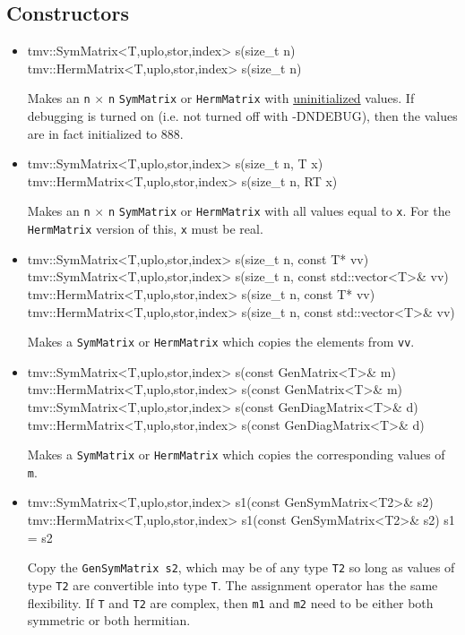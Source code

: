 \documentclass[twoside,letterpaper,11pt]{article}
\renewcommand{\tt}[1]{{\lstinline {#1}}}
\begin{document}
\subsection{Constructors}
\label{SymMatrix_Constructors}

\begin{itemize}
\item 
\begin{tmvcode}
tmv::SymMatrix<T,uplo,stor,index> s(size_t n)
tmv::HermMatrix<T,uplo,stor,index> s(size_t n)
\end{tmvcode}
Makes an \tt{n} $\times$ \tt{n} \tt{SymMatrix} or \tt{HermMatrix}
with \underline{uninitialized} values.
If debugging is turned on (i.e. not turned off
with -DNDEBUG), then the values are in fact initialized to 888.  

\item
\begin{tmvcode}
tmv::SymMatrix<T,uplo,stor,index> s(size_t n, T x)
tmv::HermMatrix<T,uplo,stor,index> s(size_t n, RT x)
\end{tmvcode}
Makes an \tt{n} $\times$ \tt{n} \tt{SymMatrix} or \tt{HermMatrix} 
with all values equal to \tt{x}.
For the \tt{HermMatrix} version of this, \tt{x} must be real.

\item
\begin{tmvcode}
tmv::SymMatrix<T,uplo,stor,index> s(size_t n, const T* vv)
tmv::SymMatrix<T,uplo,stor,index> s(size_t n, 
      const std::vector<T>& vv)
tmv::HermMatrix<T,uplo,stor,index> s(size_t n, const T* vv)
tmv::HermMatrix<T,uplo,stor,index> s(size_t n, 
      const std::vector<T>& vv)
\end{tmvcode}
Makes a \tt{SymMatrix} or \tt{HermMatrix} which copies the elements from \tt{vv}.

\item 
\begin{tmvcode}
tmv::SymMatrix<T,uplo,stor,index> s(const GenMatrix<T>& m)
tmv::HermMatrix<T,uplo,stor,index> s(const GenMatrix<T>& m)
tmv::SymMatrix<T,uplo,stor,index> s(const GenDiagMatrix<T>& d)
tmv::HermMatrix<T,uplo,stor,index> s(const GenDiagMatrix<T>& d)
\end{tmvcode}
Makes a \tt{SymMatrix} or \tt{HermMatrix} which copies the corresponding values of \tt{m}.

\item
\begin{tmvcode}
tmv::SymMatrix<T,uplo,stor,index> s1(const GenSymMatrix<T2>& s2)
tmv::HermMatrix<T,uplo,stor,index> s1(const GenSymMatrix<T2>& s2)
s1 = s2
\end{tmvcode}
Copy the \tt{GenSymMatrix s2}, which may be of any type \tt{T2} so long
as values of type \tt{T2} are convertible into type \tt{T}.
The assignment operator has the same flexibility.
If \tt{T} and \tt{T2} are complex, then \tt{m1} and \tt{m2} need to be
either both symmetric or both hermitian.


\end{itemize}
\end{document}
